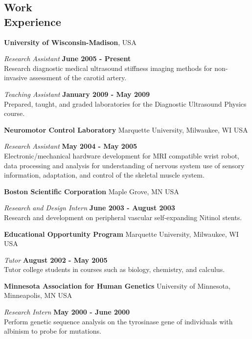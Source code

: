 \documentclass[margin,line]{res}
\begin{document}
\begin{resume}
\section{\sc Work\\ Experience}

{\bf University of Wisconsin-Madison}, USA

\vspace{-.3cm}
{\em Research Assistant} \hfill {\bf June 2005 - Present} \\
Research diagnostic medical ultrasound stiffness imaging methods for non-invasive assessment of the carotid artery. 

\vspace{-.3cm}
{\em Teaching Assistant} \hfill {\bf January 2009 - May 2009} \\
Prepared, taught, and graded laboratories for the Diagnostic Ultrasound Physics
course.

{\bf Neuromotor Control Laboratory} Marquette University, Milwaukee, WI USA

\vspace{-.3cm}
{\em Research Assistant} \hfill {\bf May 2004 - May 2005} \\
Electronic/mechanical hardware development for MRI compatible wrist robot, data processing and analysis for understanding of nervous system use of sensory information,  adaptation,  and control of the skeletal muscle system.

{\bf Boston Scientific Corporation} Maple Grove, MN USA

\vspace{-.3cm}
{\em Research and Design Intern} \hfill {\bf June 2003 - August 2003} \\
Research and development on peripheral vascular self-expanding Nitinol stents.

{\bf Educational Opportunity Program} Marquette University, Milwaukee, WI USA

\vspace{-.3cm}
{\em Tutor} \hfill {\bf August 2002 - May 2005} \\
Tutor college students in courses such as biology, chemistry, and calculus.

{\bf Minnesota Association for Human Genetics} University of Minnesota, Minneapolis, MN USA

\vspace{-.3cm}
{\em Research Intern} \hfill {\bf May 2000 - June 2000} \\
Perform genetic sequence analysis on the tyrosinase gene of individuals with albinism to probe for mutations.


\end{resume}
\end{document}
